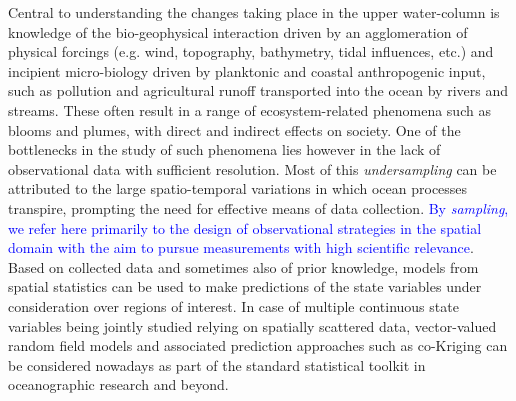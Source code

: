 \documentclass[aoas]{imsart}
\begin{document}
Central to understanding the changes taking place in the upper
water-column is knowledge of the bio-geophysical interaction driven by
an agglomeration of physical forcings (e.g. wind, topography,
bathymetry, tidal influences, etc.) and incipient micro-biology driven
by planktonic and coastal anthropogenic input, such as pollution and
agricultural runoff transported into the ocean by rivers and streams.
These often result in a range of ecosystem-related phenomena such as
blooms and plumes, with direct and indirect effects on society. 
 One of the bottlenecks in the study of such phenomena lies however in the lack of observational data with sufficient resolution. Most of this \emph{undersampling} can be attributed to the large spatio-temporal variations in which ocean processes transpire, prompting the need for effective means of data collection. 
%
 \textcolor{blue}{By \emph{sampling}, we refer here primarily to the design of observational strategies in the spatial domain %
 with the aim to pursue measurements with high scientific relevance}.
Based on collected data and sometimes also of prior knowledge, models from spatial statistics can be used to make predictions of the state variables under consideration over regions of interest. In case of multiple continuous state variables being jointly studied relying on spatially scattered data, vector-valued random field models and associated prediction approaches such as co-Kriging \citep[See, e.g.,][]{Wackernagel2003} can be considered nowadays as part of the standard statistical toolkit in oceanographic research and beyond. %
  
\end{document}
